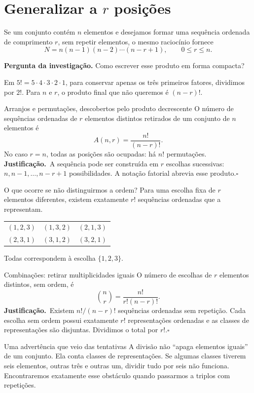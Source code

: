 \documentclass[11pt,a4paper,oneside]{book}
\newcommand{\Pergunta}[1]{\begin{perguntabox}\textbf{Pergunta da investigação.} #1\end{perguntabox}}
\newcommand{\prova}{\textbf{Justificação.}\ }
\newcommand{\fimprova}{\hfill$\square$}
\begin{document}
\section{Generalizar a \texorpdfstring{$r$}{r} posições}
Se um conjunto contém $n$ elementos e desejamos formar uma sequência ordenada de comprimento $r$, sem repetir elementos, o mesmo raciocínio fornece
\[
N=n(n-1)(n-2)\cdots(n-r+1),\qquad 0\le r\le n.
\]
\Pergunta{Como escrever esse produto em forma compacta?}
Em $5!=5\cdot4\cdot3\cdot2\cdot1$, para conservar apenas os três primeiros fatores, dividimos por $2!$. Para $n$ e $r$, o produto final que não queremos é $(n-r)!$.
\begin{teoremabox}{Arranjos e permutações, descobertos pelo produto decrescente}
O número de sequências ordenadas de $r$ elementos distintos retirados de um conjunto de $n$ elementos é
\[A(n,r)=\frac{n!}{(n-r)!}.\]
No caso $r=n$, todas as posições são ocupadas: há $n!$ permutações.
\prova A sequência pode ser construída em $r$ escolhas sucessivas: $n,n-1,\ldots,n-r+1$ possibilidades. A notação fatorial abrevia esse produto.\fimprova
\end{teoremabox}
O que ocorre se não distinguirmos a ordem? Para uma escolha fixa de $r$ elementos diferentes, existem exatamente $r!$ sequências ordenadas que a representam.
\begin{center}
\small
\begin{tabular}{ccc}
$(1,2,3)$&$(1,3,2)$&$(2,1,3)$\\
$(2,3,1)$&$(3,1,2)$&$(3,2,1)$
\end{tabular}
\end{center}
Todas correspondem à escolha $\{1,2,3\}$.
\begin{teoremabox}{Combinações: retirar multiplicidades iguais}
O número de escolhas de $r$ elementos distintos, sem ordem, é
\[\boxed{\binom nr=\frac{n!}{r!(n-r)!}}.\]
\prova Existem $n!/(n-r)!$ sequências ordenadas sem repetição. Cada escolha sem ordem possui exatamente $r!$ representações ordenadas e as classes de representações são disjuntas. Dividimos o total por $r!$.\fimprova
\end{teoremabox}
\begin{observacaobox}{Uma advertência que veio das tentativas}
A divisão não ``apaga elementos iguais'' de um conjunto. Ela conta classes de representações. Se algumas classes tiverem seis elementos, outras três e outras um, dividir tudo por seis não funciona. Encontraremos exatamente esse obstáculo quando passarmos a triplos com repetições.
\end{observacaobox}
\end{document}
